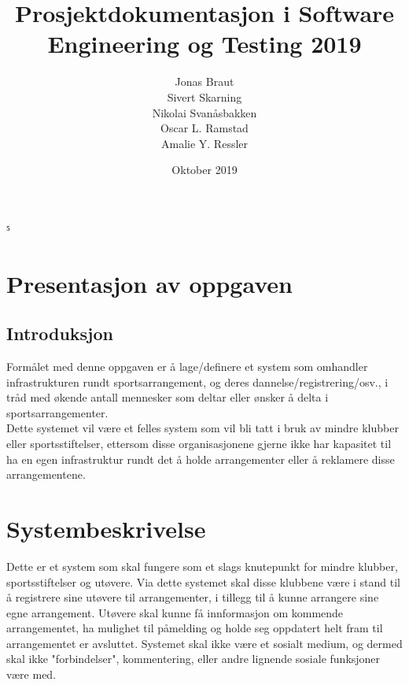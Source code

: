 ⁵\documentclass[norsk]{article}
\title{Prosjektdokumentasjon i Software Engineering og Testing 2019}
\author{Jonas Braut \\ Sivert Skarning \\ Nikolai Svanåsbakken \\Oscar L. Ramstad \\ Amalie Y. Ressler}
\date{Oktober 2019}
\begin{document}
\maketitle
\newpage
\tableofcontents
\newpage
\section{Presentasjon av oppgaven}

\subsection{Introduksjon} 

Formålet med denne oppgaven er å lage/definere et system som omhandler infrastrukturen rundt sportsarrangement, og deres dannelse/registrering/osv., i tråd med økende antall mennesker som deltar eller ønsker å delta i sportsarrangementer.\\
Dette systemet vil være et felles system som vil bli tatt i bruk av mindre klubber eller sportsstiftelser, ettersom disse organisasjonene gjerne ikke har kapasitet til ha en egen infrastruktur rundt det å holde arrangementer eller å reklamere disse arrangementene. 

\section{Systembeskrivelse}
Dette er et system som skal fungere som et slags knutepunkt for mindre klubber, sportsstiftelser og utøvere. Via dette systemet skal disse klubbene være i stand til å registrere sine utøvere til arrangementer, i tillegg til å kunne arrangere sine egne arrangement. Utøvere skal kunne få innformasjon om kommende arrangementet, ha mulighet til påmelding og holde seg oppdatert helt fram til arrangementet er avsluttet. Systemet skal ikke være et sosialt medium, og dermed skal ikke "forbindelser", kommentering, eller andre lignende sosiale funksjoner være med.
\end{document}
